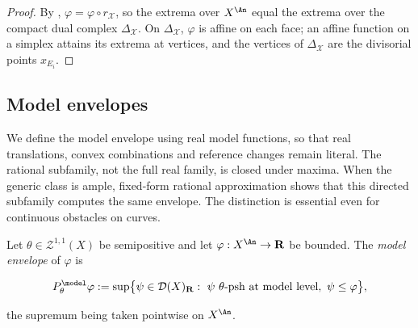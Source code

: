 \begin{proof}
By , $\varphi=\varphi\circ r_{\mathcal X}$,
so the extrema over $X^{\An}$ equal the extrema over the compact dual
complex $\Delta_{\mathcal X}$.  On $\Delta_{\mathcal X}$, $\varphi$ is
affine on each face; an affine function on a simplex attains its extrema at
vertices, and the vertices of $\Delta_{\mathcal X}$ are the divisorial
points $x_{E_i}$.
\end{proof}

\subsection{Model envelopes}
\label{sec:ch20-envelopes}

We define the model envelope using real model functions, so that real
translations, convex combinations and reference changes remain literal.
The rational subfamily, not the full real family, is closed under maxima.
When the generic class is ample, fixed-form rational approximation shows
that this directed subfamily computes the same envelope.  The distinction
is essential even for continuous obstacles on curves.

\begin{definition}
\label{def:ch20-model-envelope}
Let $\theta\in\mathcal Z^{1,1}(X)$ be semipositive and let
$\varphi:X^{\An}\to\mathbf R$ be bounded.  The \emph{model envelope} of
$\varphi$ is

\begin{equation}
\label{eq:ch20-model-envelope}
 P^{\model}_\theta\varphi
 :=\sup\bigl\{\psi\in\mathcal D(X)_{\mathbf R}:\
   \psi\ \theta\text{-psh at model level},\ \psi\leq\varphi\bigr\},
\end{equation}

the supremum being taken pointwise on $X^{\An}$.
\end{definition}

